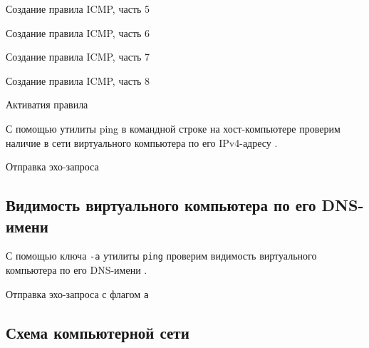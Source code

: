 \begin{image}
	\caption{Создание правила ICMP, часть 5}
	\label{fig:icmp:5}
\end{image}

\begin{image}
	\caption{Создание правила ICMP, часть 6}
	\label{fig:icmp:6}
\end{image}

\begin{image}
	\caption{Создание правила ICMP, часть 7}
	\label{fig:icmp:7}
\end{image}

\begin{image}
	\caption{Создание правила ICMP, часть 8}
	\label{fig:icmp:8}
\end{image}

\begin{image}
	\caption{Активатия правила}
	\label{fig:icmp:9}
\end{image}

С помощью утилиты ping в командной строке на хост-компьютере
проверим наличие в сети виртуального компьютера по его IPv4-адресу
.

\begin{image}
	\caption{Отправка эхо-запроса}
	\label{fig:ping}
\end{image}

\subsection{Видимость виртуального компьютера по его DNS-имени}

С помощью ключа \texttt{-a} утилиты \texttt{ping} проверим видимость
виртуального компьютера по его DNS-имени .

\begin{image}
	\caption{Отправка эхо-запроса с флагом \texttt{a}}
	\label{fig:ping:dns}
\end{image}

\subsection{Схема компьютерной сети}

